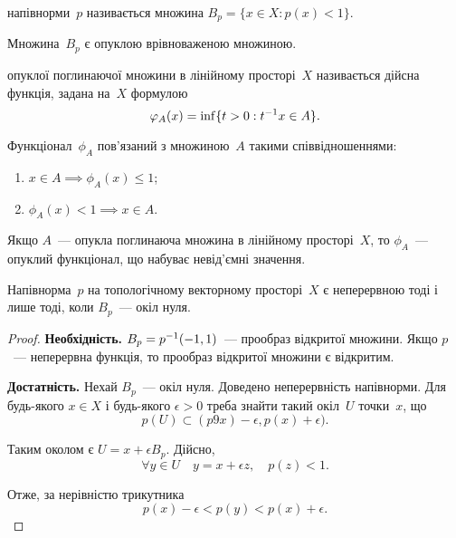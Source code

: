 \begin{definition}
     напівнорми~$p$ називається множина $B_p = \{x \in X: p(x) < 1\}$.
\end{definition}

\begin{remark}
    Множина~$B_p$ є опуклою врівноваженою множиною.
\end{remark}

\begin{definition}
     опуклої поглинаючої множини в лінійному просторі~$X$ називається дійсна функція, задана на~$X$ формулою
    \begin{equation*}
        \varphi_A(x) = \inf \{ t > 0: t^{-1} x \in A\}.
    \end{equation*}
\end{definition}

\begin{remark}
    Функціонал~$\phi_A$ пов'язаний з множиною~$A$ такими співвідношеннями:
    \begin{enumerate}
        \item $x \in A \implies \phi_A(x) \le 1$;
        \item $\phi_A(x) < 1 \implies x \in A$.
    \end{enumerate}
\end{remark}

\begin{remark}
    Якщо $A$~--- опукла поглинаюча множина в лінійному просторі~$X$, то $\phi_A$~--- опуклий функціонал, що набуває невід'ємні значення.
\end{remark}

\begin{theorem}
    Напівнорма~$p$ на топологічному векторному просторі~$X$ є неперервною тоді і лише тоді, коли $B_p$~--- окіл нуля.
\end{theorem}

\begin{proof}
    \textbf{Необхідність.} $B_p = p^{-1} (-1,1)$~--- прообраз відкритої множини. Якщо $p$~--- неперервна функція, то прообраз відкритої множини є відкритим.

    \textbf{Достатність.} Нехай $B_p$~--- окіл нуля. Доведено неперервність напівнорми. Для будь-якого $x \in X$ і будь-якого $\epsilon > 0$ треба знайти такий окіл~$U$ точки~$x$, що
    \begin{equation*}
        p(U) \subset (p9x) - \epsilon, p(x) + \epsilon).
    \end{equation*}

    Таким околом є $U = x + \epsilon B_p$. Дійсно,
    \begin{equation*}
        \forall y \in U \quad y = x + \epsilon z, \quad p(z) < 1.
    \end{equation*}

    Отже, за нерівністю трикутника
    \begin{equation*}
        p(x) - \epsilon < p(y) < p(x) + \epsilon.
    \end{equation*}
\end{proof}


